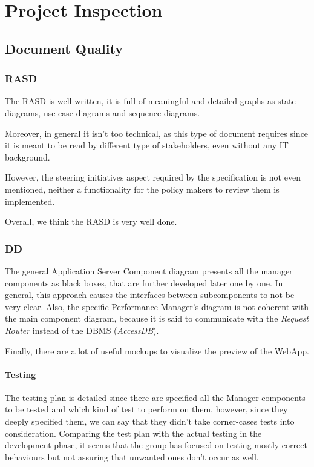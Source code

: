 \documentclass[table, 12pt]{article}
\begin{document}
\section{Project Inspection}

\subsection{Document Quality}
\subsubsection{RASD}
The RASD is well written, it is full of meaningful and detailed graphs as state diagrams, use-case diagrams and sequence diagrams. 

Moreover, in general it isn't too technical, as this type of document requires since it is meant to be read by different type of stakeholders, even without any IT background.

However, the steering initiatives aspect required by the specification is not even mentioned, neither a functionality for the policy makers to review them is implemented.

Overall, we think the RASD is very well done.

\subsubsection{DD}
The general Application Server Component diagram presents all the manager components as black boxes, that are further developed later one by one. In general, this approach causes the interfaces between subcomponents to not be very clear. Also, the specific Performance Manager's diagram is not coherent with the main component diagram, because it is said to communicate with the \textit{Request Router} instead of the DBMS (\textit{AccessDB}).

Finally, there are a lot of useful mockups to visualize the preview of the WebApp.

\paragraph{Testing}
The testing plan is detailed since there are specified all the Manager components to be tested and  which kind of test to perform on them, however, since they deeply specified them, we can say that they didn't take corner-cases tests into consideration. Comparing the test plan with the actual testing in the development phase, it seems that the group has focused on testing mostly correct behaviours but not assuring that unwanted ones don't occur as well. 
\end{document}
